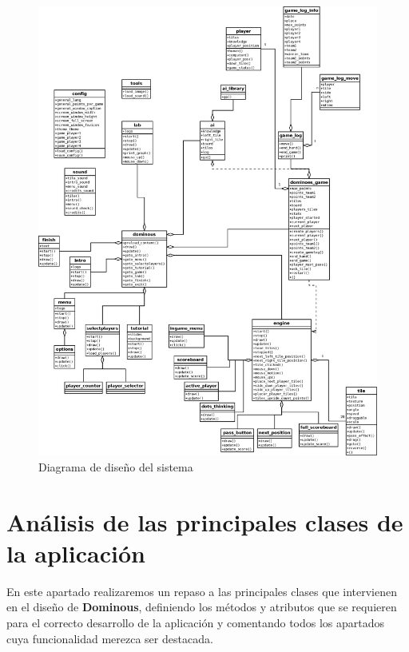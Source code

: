 \begin{figure}[h]
  \label{fig:diagrama_clases_diseno}
  \begin{center}
    \includegraphics[width=1\textwidth]{diagrama_clases_diseno.png}
  \end{center}
  \caption{Diagrama de diseño del sistema}
\end{figure}


\section{Análisis de las principales clases de la aplicación}

En este apartado realizaremos un repaso a las principales clases que intervienen en el diseño de \textbf{Dominous},
definiendo los métodos y atributos que se requieren para el correcto desarrollo de la aplicación y comentando
todos los apartados cuya funcionalidad merezca ser destacada.

